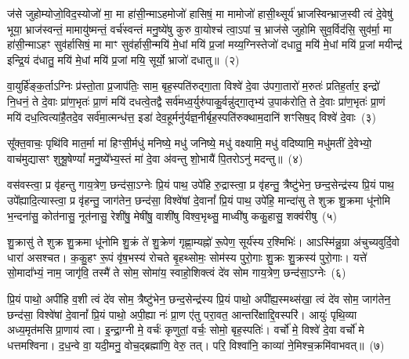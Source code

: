 ज॑से जुहोम्योजो॒विद॒स्योजो॑ मा॒ मा हा॑सी॒न्माऽहमोजो॑ हासिषं॒ मा मामोजो॑ हासी॒थ्सूर्य॑ भ्राजस्विन्भ्राज॒स्वी त्वं दे॒वेषु॑ भूया॒ भ्राज॑स्वन्तं॒ मामायु॑ष्मन्तं॒ वर्च॑स्वन्तं मनु॒ष्ये॑षु कुरु वा॒योश्च॑ त्वा॒\-ऽपां च॒ भ्राज॑से जुहोमि सुव॒र्विद॑सि॒ सुव॑र्मा॒ मा हा॑सी॒न्माऽहꣳ सुव॑र्\mbox{}हासिषं॒ मा माꣳ सुव॑र्\mbox{}हासी॒न्मयि॑ मे॒धां मयि॑ प्र॒जां मय्य॒ग्निस्तेजो॑ दधातु॒ मयि॑ मे॒धां मयि॑ प्र॒जां मयीन्द्र॑ इन्द्रि॒यं द॑धातु॒ मयि॑ मे॒धां मयि॑ प्र॒जां मयि॒ सूर्यो॒ भ्राजो॑ दधातु॥~(२)

{\anuvakamend[{क्ष॒त्रस्य॑ च॒ मयि॒ त्रयो॑विꣳशतिश्च}]}%

वा॒युर्\mbox{}हि॑ङ्क॒र्ता\-ऽग्निः प्र॑स्तो॒ता प्र॒जा\-प॑तिः॒ साम॒ बृह॒स्पति॑रुद्गा॒ता विश्वे॑ दे॒वा उ॑पगा॒तारो॑ म॒रुतः॑ प्रतिह॒र्तार॒ इन्द्रो॑ नि॒धनं॒ ते दे॒वाः प्रा॑ण॒भृतः॑ प्रा॒णं मयि॑ दधत्वे॒तद्वै सर्व॑मध्व॒र्युरु॑पाकु॒र्वन्नु॑द्गा॒तृभ्य॑ उ॒पा\-क॑रोति॒ ते दे॒वाः प्रा॑ण॒भृतः॑ प्रा॒णं मयि॑ दध॒त्वित्या॑है॒तदे॒व सर्व॑मा॒त्मन्ध॑त्त॒ इडा॑ देव॒हूर्मनु॑र्यज्ञ॒नीर्बृह॒स्पति॑रुक्थाम॒दानि॑ शꣳसिष॒द् विश्वे॑ दे॒वाः~(३)

सू᳚क्त॒वाचः॒ पृथि॑वि मात॒र्मा मा॑ हिꣳसी॒र्मधु॑ मनिष्ये॒ मधु॑ जनिष्ये॒ मधु॑ वक्ष्यामि॒ मधु॑ वदिष्यामि॒ मधु॑मतीं दे॒वेभ्यो॒ वाच॑मुद्यासꣳ शुश्रू॒षेण्यां᳚ मनु॒ष्ये᳚भ्य॒स्तं मा॑ दे॒वा अ॑वन्तु शो॒भायै॑ पि॒तरो\-ऽनु॑ मदन्तु॥~(४)

{\anuvakamend[{श॒ꣳ॒सि॒ष॒द्विश्वे॑ दे॒वा अ॒ष्टाविꣳ॑शतिश्च}]}%

वस॑वस्त्वा॒ प्र वृ॑हन्तु गाय॒त्रेण॒ छन्द॑सा॒\-ऽग्नेः प्रि॒यं पाथ॒ उपे॑हि रु॒द्रास्त्वा॒ प्र वृ॑हन्तु॒ त्रैष्टु॑भेन॒ छन्द॒सेन्द्र॑स्य प्रि॒यं पाथ॒ उपे᳚ह्यादि॒त्यास्त्वा॒ प्र वृ॑हन्तु॒ जाग॑तेन॒ छन्द॑सा॒ विश्वे॑षां दे॒वानां᳚ प्रि॒यं पाथ॒ उपे॑हि॒ मान्दा॑सु ते शुक्र शु॒क्रमा धू॑नोमि भ॒न्दना॑सु॒ कोत॑नासु॒ नूत॑नासु॒ रेशी॑षु॒ मेषी॑षु॒ वाशी॑षु विश्व॒भृथ्सु॒ माध्वी॑षु ककु॒हासु॒ शक्व॑रीषु~(५)

शु॒क्रासु॑ ते शुक्र शु॒क्रमा धू॑नोमि शु॒क्रं ते॑ शु॒क्रेण॑ गृह्णा॒म्यह्नो॑ रू॒पेण॒ सूर्य॑स्य र॒श्मिभिः॑। आ\-ऽस्मि॑न्नु॒ग्रा अ॑चुच्यवुर्दि॒वो धारा॑ असश्चत। क॒कु॒हꣳ रू॒पं वृ॑ष॒भस्य॑ रोचते बृ॒हथ्सोमः॒ सोम॑स्य पुरो॒गाः शु॒क्रः शु॒क्रस्य॑ पुरो॒गाः। यत्ते॑ सो॒मादा᳚भ्यं॒ नाम॒ जागृ॑वि॒ तस्मै॑ ते सोम॒ सोमा॑य॒ स्वाहो॒शिक्त्वं दे॑व सोम गाय॒त्रेण॒ छन्द॑सा॒\-ऽग्नेः~(६)

प्रि॒यं पाथो॒ अपी॑हि व॒शी त्वं दे॑व सोम॒ त्रैष्टु॑भेन॒ छन्द॒सेन्द्र॑स्य प्रि॒यं पाथो॒ अपी᳚ह्य॒स्मथ्स॑खा॒ त्वं दे॑व सोम॒ जाग॑तेन॒ छन्द॑सा॒ विश्वे॑षां दे॒वानां᳚ प्रि॒यं पाथो॒ अपी॒ह्या नः॑ प्रा॒ण ए॑तु परा॒वत॒ आन्तरि॑क्षाद्दि॒वस्परि॑। आयुः॑ पृथि॒व्या अध्य॒मृत॑मसि प्रा॒णाय॑ त्वा। इ॒न्द्रा॒ग्नी मे॒ वर्चः॑ कृणुतां॒ वर्चः॒ सोमो॒ बृह॒स्पतिः॑। वर्चो॑ मे॒ विश्वे॑ दे॒वा वर्चो॑ मे धत्तमश्विना। द॒ध॒न्वे वा॒ यदी॒मनु॒ वोच॒द्ब्रह्मा॑णि॒ वेरु॒ तत्। परि॒ विश्वा॑नि॒ काव्या॑ ने॒मिश्च॒क्रमि॑वाभवत्॥~(७)

